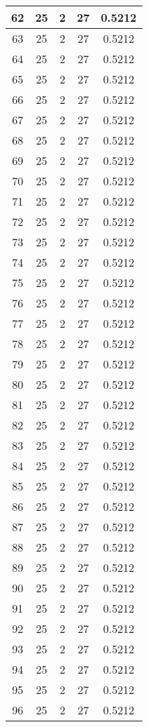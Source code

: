 \documentclass[letterpaper, 12pt]{article}
\begin{document}
\begin{longtable}{|c|c|c|c|c|}
\hline
62 & 25 & 2 & 27 & 0.5212 \\
\hline
63 & 25 & 2 & 27 & 0.5212 \\
\hline
64 & 25 & 2 & 27 & 0.5212 \\
\hline
65 & 25 & 2 & 27 & 0.5212 \\
\hline
66 & 25 & 2 & 27 & 0.5212 \\
\hline
67 & 25 & 2 & 27 & 0.5212 \\
\hline
68 & 25 & 2 & 27 & 0.5212 \\
\hline
69 & 25 & 2 & 27 & 0.5212 \\
\hline
70 & 25 & 2 & 27 & 0.5212 \\
\hline
71 & 25 & 2 & 27 & 0.5212 \\
\hline
72 & 25 & 2 & 27 & 0.5212 \\
\hline
73 & 25 & 2 & 27 & 0.5212 \\
\hline
74 & 25 & 2 & 27 & 0.5212 \\
\hline
75 & 25 & 2 & 27 & 0.5212 \\
\hline
76 & 25 & 2 & 27 & 0.5212 \\
\hline
77 & 25 & 2 & 27 & 0.5212 \\
\hline
78 & 25 & 2 & 27 & 0.5212 \\
\hline
79 & 25 & 2 & 27 & 0.5212 \\
\hline
80 & 25 & 2 & 27 & 0.5212 \\
\hline
81 & 25 & 2 & 27 & 0.5212 \\
\hline
82 & 25 & 2 & 27 & 0.5212 \\
\hline
83 & 25 & 2 & 27 & 0.5212 \\
\hline
84 & 25 & 2 & 27 & 0.5212 \\
\hline
85 & 25 & 2 & 27 & 0.5212 \\
\hline
86 & 25 & 2 & 27 & 0.5212 \\
\hline
87 & 25 & 2 & 27 & 0.5212 \\
\hline
88 & 25 & 2 & 27 & 0.5212 \\
\hline
89 & 25 & 2 & 27 & 0.5212 \\
\hline
90 & 25 & 2 & 27 & 0.5212 \\
\hline
91 & 25 & 2 & 27 & 0.5212 \\
\hline
92 & 25 & 2 & 27 & 0.5212 \\
\hline
93 & 25 & 2 & 27 & 0.5212 \\
\hline
94 & 25 & 2 & 27 & 0.5212 \\
\hline
95 & 25 & 2 & 27 & 0.5212 \\
\hline
96 & 25 & 2 & 27 & 0.5212 \\

\end{longtable}
\end{document}
